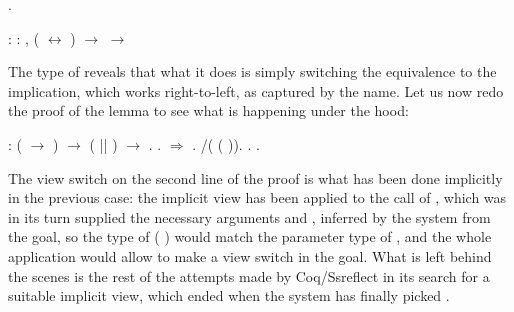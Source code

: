 \begin{coqdoccode}
\coqdocemptyline
\coqdocnoindent
{} .\coqdoceol
\coqdocemptyline
\end{coqdoccode}


\coqdoceol
\coqdocemptyline
\coqdocnoindent
{}\coqdoceol
\coqdocindent{2.50em}
: \coqdockw{\ensuremath{\forall}}   : , ( \ensuremath{\leftrightarrow} ) \ensuremath{\rightarrow}  \ensuremath{\rightarrow} 

\coqdocemptyline


The type of  reveals that what it does is simply switching the
equivalence to the implication, which works right-to-left, as captured
by the name. Let us now redo the proof of the  lemma to see
what is happening under the hood:


\begin{coqdoccode}
\coqdocemptyline
\coqdocnoindent
{}   : (  \ensuremath{\rightarrow} ) \ensuremath{\rightarrow}  ( || ) \ensuremath{\rightarrow} .\coqdoceol
\coqdocnoindent
{}.\coqdoceol
\coqdocnoindent
{}\ensuremath{\Rightarrow} .\coqdoceol
\coqdocnoindent
{}/( (  )).\coqdoceol
\coqdocnoindent
{}.\coqdoceol
\coqdocnoindent
{}.\coqdoceol
\coqdocemptyline
\end{coqdoccode}


The view switch on the second line of the proof is what has been done
implicitly in the previous case: the implicit view  has been
applied to the call of , which was in its turn supplied the
necessary arguments  and , inferred by the system from the goal,
so the type of (  ) would match the parameter type of
, and the whole application would allow to make a view switch
in the goal.  What is left behind the scenes is the rest of the
attempts made by Coq/Ssreflect in its search for a suitable implicit
view, which ended when the system has finally picked .


